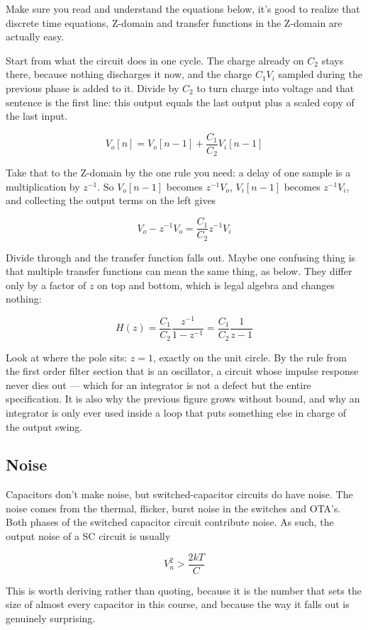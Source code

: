 Make sure you read and understand the equations below, it's good to
realize that discrete time equations, Z-domain and transfer functions in
the Z-domain are actually easy.

Start from what the circuit does in one cycle. The charge already on
\(C_2\) stays there, because nothing discharges it now, and the charge
\(C_1V_i\) sampled during the previous phase is added to it. Divide by
\(C_2\) to turn charge into voltage and that sentence is the first line:
this output equals the last output plus a scaled copy of the last input.

\[ V_o[n] = V_o[n-1] + \frac{C_1}{C_2}V_i[n-1]\]

Take that to the Z-domain by the one rule you need: a delay of one
sample is a multiplication by \(z^{-1}\). So \(V_o[n-1]\) becomes
\(z^{-1}V_o\), \(V_i[n-1]\) becomes \(z^{-1}V_i\), and collecting the
output terms on the left gives

\[V_o - z^{-1}V_o = \frac{C_1}{C_2}z^{-1}V_i \]

Divide through and the transfer function falls out. Maybe one confusing
thing is that multiple transfer functions can mean the same thing, as
below. They differ only by a factor of \(z\) on top and bottom, which is
legal algebra and changes nothing:

\[ H(z) = \frac{C_1}{C_2}\frac{z^{-1}}{1-z^{-1} } =
\frac{C_1}{C_2}\frac{1}{z-1} \]

Look at where the pole sits: \(z = 1\), exactly on the unit circle. By
the rule from the first order filter section that is an oscillator, a
circuit whose impulse response never dies out --- which for an
integrator is not a defect but the entire specification. It is also why
the previous figure grows without bound, and why an integrator is only
ever used inside a loop that puts something else in charge of the output
swing.

\subsection{Noise}\label{noise}

Capacitors don't make noise, but switched-capacitor circuits do have
noise. The noise comes from the thermal, flicker, burst noise in the
switches and OTA's. Both phases of the switched capacitor circuit
contribute noise. As such, the output noise of a SC circuit is usually

\[ V_n^2 > \frac{2 k T}{C}\]

This is worth deriving rather than quoting, because it is the number
that sets the size of almost every capacitor in this course, and because
the way it falls out is genuinely surprising.

